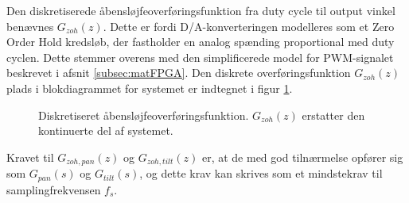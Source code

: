 Den diskretiserede åbensløjfeoverføringsfunktion fra duty cycle til output vinkel
benævnes \(G_{zoh}\left(z\right)\). Dette er fordi D/A-konverteringen modelleres som et Zero Order Hold kredsløb,
der fastholder en analog spænding proportional med duty cyclen. Dette stemmer overens med den simplificerede
model for PWM-signalet beskrevet i afsnit \ref{subsec:matFPGA}.
Den diskrete overføringsfunktion \(G_{zoh}\left(z\right)\) plads i blokdiagrammet for systemet
er indtegnet i figur \ref{fig:digitalkontroller3}.
\begin{figure}[!th]
\centering
\begin{tikzpicture}[scale=0.9, every node/.style={scale=0.9}, node distance=2.6cm, =>latex']

\end{tikzpicture}
\caption[Diskretiseret åbensløjfeoverføringsfunktion]
		{Diskretiseret åbensløjfeoverføringsfunktion.
		\(G_{zoh}\left(z\right)\) erstatter den kontinuerte del af systemet.}
\label{fig:digitalkontroller3}
\end{figure}

Kravet til \(G_{zoh,pan}\left(z\right)\) og \(G_{zoh,tilt}\left(z\right)\) er, at de
med god tilnærmelse opfører sig som \(G_{pan}\left(s\right)\) og \(G_{tilt}\left(s\right)\),
og dette krav kan skrives som et mindstekrav til samplingfrekvensen \(f_s\).

